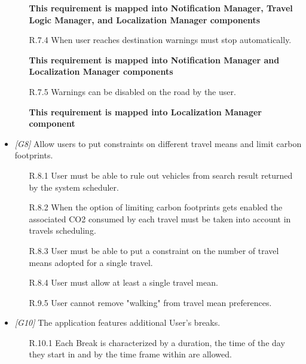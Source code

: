 \begin{itemize}
\begin{itemize}
			\textbf{This requirement is mapped into Notification Manager, Travel Logic Manager, and Localization Manager components}

			\item [R.7.4] When user reaches destination warnings must stop automatically.
			
			\textbf{This requirement is mapped into Notification Manager and Localization Manager components}

			\item [R.7.5] Warnings can be disabled on the road by the user.
			
			\textbf{This requirement is mapped into Localization Manager component}
			

		\end{itemize}





	\item \textit{[G8]} Allow users to put constraints on different travel means and limit carbon footprints.

		\begin{itemize}

			\item[R.8.1] User must be able to rule out vehicles from search result returned by the system scheduler.

			\item[R.8.2] When the option of limiting carbon footprints gets enabled the associated CO2 consumed by each travel must be taken into account in travels scheduling.

			\item[R.8.3] User must be able to put a constraint on the number of travel means adopted for a single travel.

			\item[R.8.4] User must allow at least a single travel mean.

			\item[R.9.5] User cannot remove "walking" from travel mean preferences.

		\end{itemize}





	\item \textit{[G10]} The application features additional User’s breaks.

		\begin{itemize}

			\item [R.10.1] Each Break is characterized by a duration, the time of the day they start in and by the time frame within are allowed.


\end{itemize}
\end{itemize}
